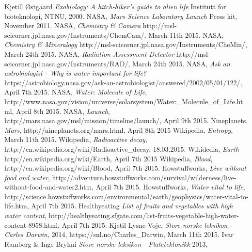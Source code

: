 \begin{thebibliography}{99}	%
		Kjetill Østgaard
		\emph{Exobiology: A hitch-hiker's guide to alien life}
		Institutt for bioteknologi,
		NTNU,
		2000.
		NASA,
		\emph{Mars Science Laboratory Launch}
		Press kit,
		November 2011.
		NASA,
		\emph{Chemistry \& Camera}
		http://msl-scicorner.jpl.nasa.gov/Instruments/ChemCam/,
		March 11th 2015.
		NASA,
		\emph{Chemistry \& Mineralogy}
		http://msl-scicorner.jpl.nasa.gov/Instruments/CheMin/,
		March 24th 2015.
		NASA,
		\emph{Radiation Assessment Detector}
		http://msl-scicorner.jpl.nasa.gov/Instruments/RAD/,
		March 24th 2015.
		NASA,
		\emph{Ask an astrobiologist - Why is water important for life?}
		https://astrobiology.nasa.gov/ask-an-astrobiologist/answered/2002/05/01/122/,
		April 7th 2015.
		NASA,
		\emph{Water: Molecule of Life},
		http://www.nasa.gov/vision/universe/solarsystem/Water:\_Molecule\_of\_Life.html,
		April 8th 2015.
		NASA,
		\emph{Launch},
		http://mars.nasa.gov/msl/mission/timeline/launch/,
		April 9th 2015.
		Nineplanets,
		\emph{Mars},
		http://nineplanets.org/mars.html,
		April 8th 2015
		Wikipedia,
		\emph{Entropy},
		March 11th 2015.
		Wikipedia,
		\emph{Radioactive decay},
		http://en.wikipedia.org/wiki/Radioactive\_decay,
		18.03.2015.
		Wikidedia,
		\emph{Earth}
		http://en.wikipedia.org/wiki/Earth,
		April 7th 2015
		Wikipedia,
		\emph{Blood},
		http://en.wikipedia.org/wiki/Blood,
		April 7th 2015.
		Howstuffworks,
		\emph{Live without food and water},
		http://adventure.howstuffworks.com/survival/wilderness/live-without-food-and-water2.htm,
		April 7th 2015.
		Howstuffworks,
		\emph{Water vital to life},
		http://science.howstuffworks.com/environmental/earth/geophysics/water-vital-to-life.htm,
		April 7th 2015.
		Healthyeating
		\emph{List of fruits and vegetables with high water content},
		http://healthyeating.sfgate.com/list-fruits-vegetable-high-water-content-8958.html,
		April 7th 2015.
		Kjetil Lysne Voje,
		\emph{Store norske leksikon - Carles Darwin},
		2014,
		https://snl.no/Charles\_Darwin,
		March 11th 2015.
		Ivar Ramberg \& Inge Bryhni
		\emph{Store norske leksikon - Platetektonikk}
		2013,

\end{thebibliography}
